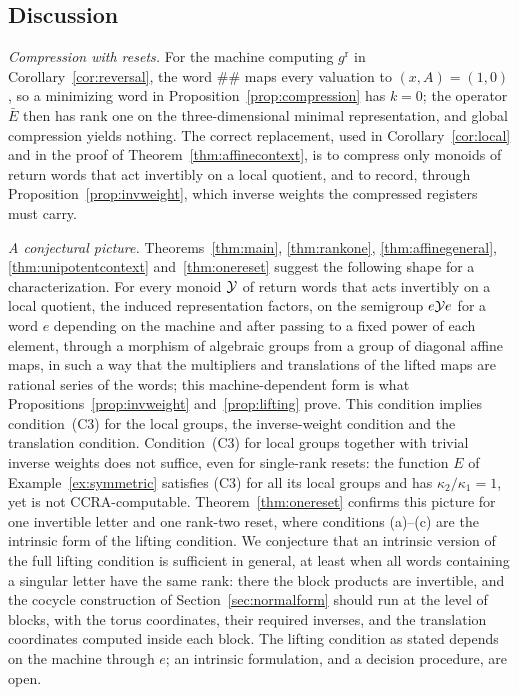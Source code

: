 \subsection{Discussion}\label{sec:singular-checks}
\emph{Compression with resets.} For the machine computing $g^{\mathrm r}$ in Corollary~\ref{cor:reversal}, the word $\#\#$ maps every valuation to $(x,A)=(1,0)$, so a minimizing word in Proposition~\ref{prop:compression} has $k=0$; the operator $\bar E$ then has rank one on the three-dimensional minimal representation, and global compression yields nothing. The correct replacement, used in Corollary~\ref{cor:local} and in the proof of Theorem~\ref{thm:affinecontext}, is to compress only monoids of return words that act invertibly on a local quotient, and to record, through Proposition~\ref{prop:invweight}, which inverse weights the compressed registers must carry.

\emph{A conjectural picture.} Theorems~\ref{thm:main}, \ref{thm:rankone}, \ref{thm:affinegeneral}, \ref{thm:unipotentcontext} and~\ref{thm:onereset} suggest the following shape for a characterization. For every monoid $\mathcal{Y}$ of return words that acts invertibly on a local quotient, the induced representation factors, on the semigroup $e\mathcal{Y} e$ for a word $e$ depending on the machine and after passing to a fixed power of each element, through a morphism of algebraic groups from a group of diagonal affine maps, in such a way that the multipliers and translations of the lifted maps are rational series of the words; this machine-dependent form is what Propositions~\ref{prop:invweight} and~\ref{prop:lifting} prove. This condition implies condition~(C3) for the local groups, the inverse-weight condition and the translation condition. Condition~(C3) for local groups together with trivial inverse weights does not suffice, even for single-rank resets: the function $E$ of Example~\ref{ex:symmetric} satisfies (C3) for all its local groups and has $\kappa_2/\kappa_1=1$, yet is not CCRA-computable. Theorem~\ref{thm:onereset} confirms this picture for one invertible letter and one rank-two reset, where conditions (a)--(c) are the intrinsic form of the lifting condition. We conjecture that an intrinsic version of the full lifting condition is sufficient in general, at least when all words containing a singular letter have the same rank: there the block products are invertible, and the cocycle construction of Section~\ref{sec:normalform} should run at the level of blocks, with the torus coordinates, their required inverses, and the translation coordinates computed inside each block. The lifting condition as stated depends on the machine through $e$; an intrinsic formulation, and a decision procedure, are open.


